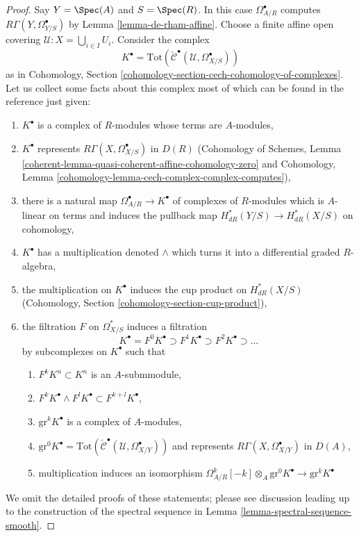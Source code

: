 \begin{proof}
Say $Y = \Spec(A)$ and $S = \Spec(R)$.
In this case $\Omega^\bullet_{A/R}$ computes
$R\Gamma(Y, \Omega^\bullet_{Y/S})$ by Lemma \ref{lemma-de-rham-affine}.
Choose a finite affine open covering $\mathcal{U} : X = \bigcup_{i \in I} U_i$.
Consider the complex
$$
K^\bullet =
\text{Tot}(\check{\mathcal{C}}^\bullet(\mathcal{U}, \Omega_{X/S}^\bullet))
$$
as in
Cohomology, Section \ref{cohomology-section-cech-cohomology-of-complexes}.
Let us collect some facts about this complex most of which
can be found in the reference just given:
\begin{enumerate}
\item $K^\bullet$ is a complex of $R$-modules whose terms are
$A$-modules,
\item $K^\bullet$ represents $R\Gamma(X, \Omega^\bullet_{X/S})$ in $D(R)$
(Cohomology of Schemes, Lemma
\ref{coherent-lemma-quasi-coherent-affine-cohomology-zero} and
Cohomology, Lemma \ref{cohomology-lemma-cech-complex-complex-computes}),
\item there is a natural map $\Omega^\bullet_{A/R} \to K^\bullet$
of complexes of $R$-modules which is $A$-linear on terms and
induces the pullback map $H^*_{dR}(Y/S) \to H^*_{dR}(X/S)$
on cohomology,
\item $K^\bullet$ has a multiplication denoted $\wedge$
which turns it into a differential graded $R$-algebra,
\item the multiplication on $K^\bullet$
induces the cup product on $H^*_{dR}(X/S)$
(Cohomology, Section \ref{cohomology-section-cup-product}),
\item the filtration $F$ on $\Omega^*_{X/S}$ induces a filtration
$$
K^\bullet =
F^0K^\bullet \supset F^1K^\bullet \supset F^2K^\bullet \supset \ldots
$$
by subcomplexes on $K^\bullet$ such that
\begin{enumerate}
\item $F^kK^n \subset K^n$ is an $A$-submmodule,
\item $F^kK^\bullet \wedge F^lK^\bullet \subset F^{k + l}K^\bullet$,
\item $\text{gr}^kK^\bullet$ is a complex of $A$-modules,
\item $\text{gr}^0K^\bullet =
\text{Tot}(\check{\mathcal{C}}^\bullet(\mathcal{U}, \Omega_{X/Y}^\bullet))$
and represents $R\Gamma(X, \Omega^\bullet_{X/Y})$ in $D(A)$,
\item multiplication induces an isomorphism
$\Omega^k_{A/R}[-k] \otimes_A \text{gr}^0K^\bullet \to \text{gr}^kK^\bullet$
\end{enumerate}
\end{enumerate}
We omit the detailed proofs of these statements; please see discussion
leading up to the construction of the spectral sequence in
Lemma \ref{lemma-spectral-sequence-smooth}.


\end{proof}
